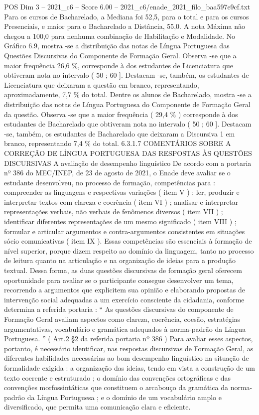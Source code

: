 \begin{textsample}{POS Dim 3 – 2021\_c6 – Score 6.00 – 2021\_c6/enade\_2021\_filo\_baa597e9cf.txt}
Para os cursos de Bacharelado, a Mediana foi 52,5, para o total e para os cursos Presenciais, e maior para o Bacharelado a Distância, 55,0.
A nota Máxima não chegou a 100,0 para nenhuma combinação de Habilitação e Modalidade.
No Gráfico 6.9, mostra -se a distribuição das notas de Língua Portuguesa das Questões Discursivas do Componente de Formação Geral.
Observa -se que a maior frequência 26,6 \%, corresponde à dos estudantes de Licenciatura que obtiveram nota no intervalo ( 50 ; 60 ].
Destacam -se, também, os estudantes de Licenciatura que deixaram a questão em branco, representando, aproximadamente, 7,7 \% do total.
Dentre os alunos de Bacharelado, mostra -se a distribuição das notas de Língua Portuguesa do Componente de Formação Geral da questão.
Observa -se que a maior frequência ( 29,4 \% ) corresponde à dos estudantes de Bacharelado que obtiveram nota no intervalo ( 50 ; 60 ].
Destacam -se, também, os estudantes de Bacharelado que deixaram a Discursiva 1 em branco, representando 7,4 \% do total. 6.3.1.7 COMENTÁRIOS SOBRE A CORREÇÃO DE LÍNGUA PORTUGUESA DAS RESPOSTAS ÀS QUESTÕES DISCURSIVAS A avaliação de desempenho linguístico De acordo com a portaria nº 386 do MEC/INEP, de 23 de agosto de 2021, o Enade deve avaliar se o estudante desenvolveu, no processo de formação, competências para : compreender as linguagens e respectivas variações ( item V ) ; ler, produzir e interpretar textos com clareza e coerência ( item VI ) ; analisar e interpretar representações verbais, não verbais de fenômenos diversos ( item VII ) ; identificar diferentes representações de um mesmo significado ( item VIII ) ; formular e articular argumentos e contra-argumentos consistentes em situações sócio comunicativas ( item IX ).
Essas competências são essenciais à formação de nível superior, porque dizem respeito ao domínio da linguagem, tanto no processo de leitura quanto na articulação e na organização de ideias para a produção textual.
Dessa forma, as duas questões discursivas de formação geral oferecem oportunidade para avaliar se o participante consegue desenvolver um tema, recorrendo a argumentos que explicitem sua opinião e elaborando propostas de intervenção social adequadas a um exercício consciente da cidadania, conforme determina a referida portaria : “ As questões discursivas do componente de Formação Geral avaliam aspectos como clareza, coerência, coesão, estratégias argumentativas, vocabulário e gramática adequados à norma-padrão da Língua Portuguesa. ” ( Art.2 §2 da referida portaria nº 386 ) Para avaliar esses aspectos, portanto, é necessário identificar, nas respostas discursivas de Formação Geral, as diferentes habilidades necessárias ao bom desempenho linguístico na situação de formalidade exigida : a organização das ideias, tendo em vista a construção de um texto coerente e estruturado ; o domínio das convenções ortográficas e das convenções morfossintáticas que constituem o arcabouço da gramática da norma-padrão da Língua Portuguesa ; e o domínio de um vocabulário amplo e diversificado, que permita uma comunicação clara e eficiente.

\end{textsample}
